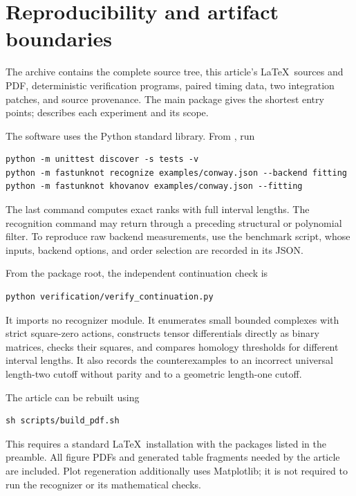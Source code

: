 \section{Reproducibility and artifact boundaries}
\label{app:reproduction}

The archive contains the complete  source tree, this article's
\LaTeX\ sources and PDF, deterministic verification programs, paired timing
data, two integration patches, and source provenance. The main package
 gives the shortest entry points; 
describes each experiment and its scope.

The software uses the Python standard library. From , run
\begin{lstlisting}
python -m unittest discover -s tests -v
python -m fastunknot recognize examples/conway.json --backend fitting
python -m fastunknot khovanov examples/conway.json --fitting
\end{lstlisting}
The last command computes exact ranks with full interval lengths. The
recognition command may return through a preceding structural or polynomial
filter. To reproduce raw backend measurements, use the benchmark script,
whose inputs, backend options, and order selection are recorded in its JSON.

From the package root, the independent continuation check is
\begin{lstlisting}
python verification/verify_continuation.py
\end{lstlisting}
It imports no recognizer module. It enumerates small bounded complexes with
strict square-zero actions, constructs tensor differentials directly as
binary matrices, checks their squares, and compares homology thresholds for
different interval lengths. It also records the counterexamples to an
incorrect universal length-two cutoff without parity and to a geometric
length-one cutoff.

\par\noindent\begin{minipage}{\linewidth}
The article can be rebuilt using
\begin{lstlisting}
sh scripts/build_pdf.sh
\end{lstlisting}
\end{minipage}\par
This requires a standard \LaTeX\ installation with the packages listed in
the preamble. All figure PDFs and generated table fragments needed by the
article are included. Plot regeneration additionally uses Matplotlib; it is
not required to run the recognizer or its mathematical checks.

